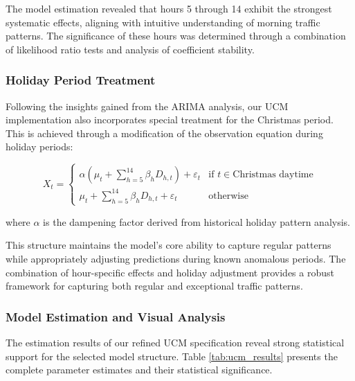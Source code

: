 \documentclass{article}
\begin{document}
The model estimation revealed that hours 5 through 14 exhibit the strongest systematic effects, aligning with intuitive understanding of morning traffic patterns. The significance of these hours was determined through a combination of likelihood ratio tests and analysis of coefficient stability.

\subsubsection{Holiday Period Treatment}
Following the insights gained from the ARIMA analysis, our UCM implementation also incorporates special treatment for the Christmas period. This is achieved through a modification of the observation equation during holiday periods:

\begin{equation}
X_t = \begin{cases}
    \alpha(\mu_t + \sum_{h=5}^{14} \beta_h D_{h,t}) + \varepsilon_t & \text{if } t \in \text{Christmas daytime} \\
    \mu_t + \sum_{h=5}^{14} \beta_h D_{h,t} + \varepsilon_t & \text{otherwise}
\end{cases}
\end{equation}

where $\alpha$ is the dampening factor derived from historical holiday pattern analysis.

This structure maintains the model's core ability to capture regular patterns while appropriately adjusting predictions during known anomalous periods. The combination of hour-specific effects and holiday adjustment provides a robust framework for capturing both regular and exceptional traffic patterns.

\subsubsection{Model Estimation and Visual Analysis}

The estimation results of our refined UCM specification reveal strong statistical support for the selected model structure. Table \ref{tab:ucm_results} presents the complete parameter estimates and their statistical significance.
\end{document}
